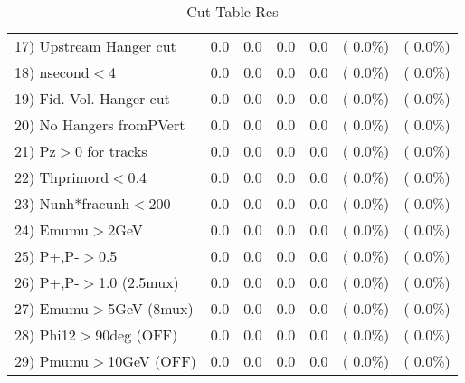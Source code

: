 \begin{table}[h!]
\begin{tabular}{||l||r|r|r|r|r|r||}
 17) Upstream Hanger cut  &          0.0 &          0.0 &          0.0 &          0.0 & (  0.0\%) & (  0.0\%) \\
 18) nsecond$<$4          &          0.0 &          0.0 &          0.0 &          0.0 & (  0.0\%) & (  0.0\%) \\
 19) Fid. Vol. Hanger cut &          0.0 &          0.0 &          0.0 &          0.0 & (  0.0\%) & (  0.0\%) \\
 20) No Hangers fromPVert &          0.0 &          0.0 &          0.0 &          0.0 & (  0.0\%) & (  0.0\%) \\
 21) Pz$>$0 for tracks    &          0.0 &          0.0 &          0.0 &          0.0 & (  0.0\%) & (  0.0\%) \\
 22) Thprimord$<$0.4      &          0.0 &          0.0 &          0.0 &          0.0 & (  0.0\%) & (  0.0\%) \\
 23) Nunh*fracunh$<$200   &          0.0 &          0.0 &          0.0 &          0.0 & (  0.0\%) & (  0.0\%) \\
 24) Emumu$>$2GeV         &          0.0 &          0.0 &          0.0 &          0.0 & (  0.0\%) & (  0.0\%) \\
 25) P+,P-$>$0.5          &          0.0 &          0.0 &          0.0 &          0.0 & (  0.0\%) & (  0.0\%) \\
 26) P+,P-$>$1.0 (2.5mux) &          0.0 &          0.0 &          0.0 &          0.0 & (  0.0\%) & (  0.0\%) \\
 27) Emumu$>$5GeV  (8mux) &          0.0 &          0.0 &          0.0 &          0.0 & (  0.0\%) & (  0.0\%) \\
 28) Phi12$>$90deg  (OFF) &          0.0 &          0.0 &          0.0 &          0.0 & (  0.0\%) & (  0.0\%) \\
 29) Pmumu$>$10GeV  (OFF) &          0.0 &          0.0 &          0.0 &          0.0 & (  0.0\%) & (  0.0\%) \\
 \hline
 \hline
 \end{tabular}
 \caption{Cut Table  Res      }
 \label{tab-cutcohjpsi-mumu_res}
 \end{table}
